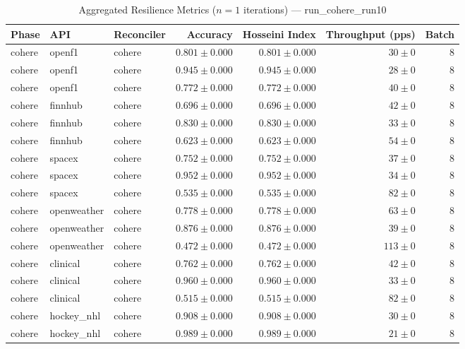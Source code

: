 
\begin{table}[htbp]
\caption{Aggregated Resilience Metrics ($n=1$ iterations) --- run_cohere_run10}
\begin{tabular}{l l l r r r r}
\hline
Phase & API & Reconciler & Accuracy & Hosseini Index & Throughput (pps) & Batch \\
\hline
cohere & openf1 & cohere & $0.801\pm0.000$ & $0.801\pm0.000$ & $30\pm0$ & 8 \\
cohere & openf1 & cohere & $0.945\pm0.000$ & $0.945\pm0.000$ & $28\pm0$ & 8 \\
cohere & openf1 & cohere & $0.772\pm0.000$ & $0.772\pm0.000$ & $40\pm0$ & 8 \\
cohere & finnhub & cohere & $0.696\pm0.000$ & $0.696\pm0.000$ & $42\pm0$ & 8 \\
cohere & finnhub & cohere & $0.830\pm0.000$ & $0.830\pm0.000$ & $33\pm0$ & 8 \\
cohere & finnhub & cohere & $0.623\pm0.000$ & $0.623\pm0.000$ & $54\pm0$ & 8 \\
cohere & spacex & cohere & $0.752\pm0.000$ & $0.752\pm0.000$ & $37\pm0$ & 8 \\
cohere & spacex & cohere & $0.952\pm0.000$ & $0.952\pm0.000$ & $34\pm0$ & 8 \\
cohere & spacex & cohere & $0.535\pm0.000$ & $0.535\pm0.000$ & $82\pm0$ & 8 \\
cohere & openweather & cohere & $0.778\pm0.000$ & $0.778\pm0.000$ & $63\pm0$ & 8 \\
cohere & openweather & cohere & $0.876\pm0.000$ & $0.876\pm0.000$ & $39\pm0$ & 8 \\
cohere & openweather & cohere & $0.472\pm0.000$ & $0.472\pm0.000$ & $113\pm0$ & 8 \\
cohere & clinical & cohere & $0.762\pm0.000$ & $0.762\pm0.000$ & $42\pm0$ & 8 \\
cohere & clinical & cohere & $0.960\pm0.000$ & $0.960\pm0.000$ & $33\pm0$ & 8 \\
cohere & clinical & cohere & $0.515\pm0.000$ & $0.515\pm0.000$ & $82\pm0$ & 8 \\
cohere & hockey\_nhl & cohere & $0.908\pm0.000$ & $0.908\pm0.000$ & $30\pm0$ & 8 \\
cohere & hockey\_nhl & cohere & $0.989\pm0.000$ & $0.989\pm0.000$ & $21\pm0$ & 8 \\

\end{tabular}
\end{table}
